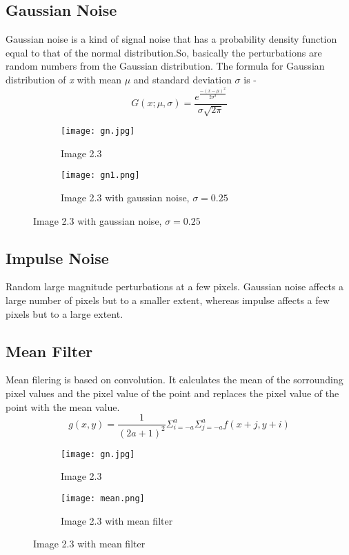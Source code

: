 \documentclass{report}
\begin{document}
\subsection{Gaussian Noise}
Gaussian noise is a kind of signal noise that has a probability density function equal to that of the normal distribution.So, basically the perturbations are random numbers from the Gaussian distribution.
The formula for Gaussian distribution of \textit{x} with mean $\mu$ and standard deviation $\sigma$ is -
\[G(x;\mu,\sigma) = \frac{e^{\frac{-(x-\mu)^2}{2\sigma^2}}}{\sigma\sqrt{2\pi}}\]
\begin{figure}[h]
    \begin{subfigure}{0.4\textwidth}
    \centering
    \texttt{[image: gn.jpg]}
    \caption{Image 2.3}
    \end{subfigure}
    \begin{subfigure}{0.4\textwidth}
    \centering
    \texttt{[image: gn1.png]}
    \caption{Image 2.3 with gaussian noise, $\sigma=0.25$}
    \end{subfigure}
\end{figure}
\subsection{Impulse Noise}
Random large magnitude perturbations at a few pixels.
Gaussian noise affects a large number of pixels but to a smaller extent, whereas impulse affects a few pixels but to a large extent.
\subsection{Mean Filter}
Mean filering is based on convolution. It calculates the mean of the sorrounding pixel values and the pixel value of the point and replaces the pixel value of the point with the mean value.
\[g(x,y) = \frac{1}{(2a+1)^2}\Sigma_{i=-a}^{a}\Sigma_{j=-a}^{a}f(x+j, y+i)\]
\begin{figure}[t]
    \begin{subfigure}{0.4\textwidth}
    \centering
    \texttt{[image: gn.jpg]}
    \caption{Image 2.3}
    \end{subfigure}
    \begin{subfigure}{0.4\textwidth}
    \centering
    \texttt{[image: mean.png]}
    \caption{Image 2.3 with mean filter}
    \end{subfigure}
\end{figure}
\\ \\ 
\end{document}
